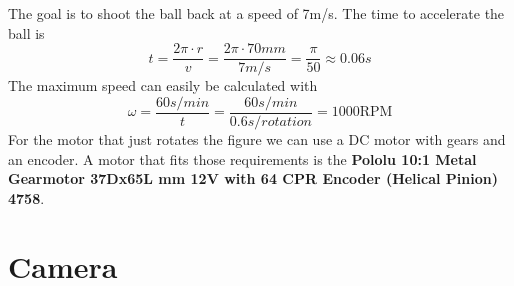 The goal is to shoot the ball back at a speed of 7m/s.
The time to accelerate the ball is
\begin{equation}
    \label{eq:time}
    t = \frac{2\pi\cdot r}{v} = \frac{2\pi\cdot 70mm}{7m/s} = \frac{\pi}{50} \approx 0.06s
\end{equation}
The maximum speed can easily be calculated with
\begin{equation}
    \label{eq:max_speed}
    \omega = \frac{60s/min}{t} = \frac{60s/min}{0.6s/rotation} = 1000\text{RPM}
\end{equation}
For the motor that just rotates the figure we can use a DC motor with gears and an encoder.
A motor that fits those requirements is the \textbf{Pololu 10:1 Metal Gearmotor 37Dx65L mm 12V with 64 CPR Encoder (Helical Pinion) 4758}.


\section{Camera}\label{sec:camera}

